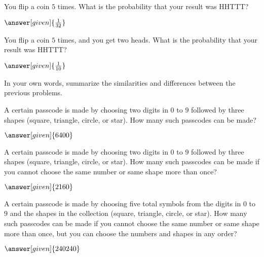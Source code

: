 \documentclass[nooutcomes]{ximera}
\begin{document}
\begin{problem}
	You flip a coin $5$ times.  What is the probability that your result was HHTTT?
	\begin{prompt}
		$\answer[given]{\frac{1}{32}}$
	\end{prompt}
\end{problem}


\begin{problem}
	You flip a coin $5$ times, and you get two heads.  What is the probability that your result was HHTTT?
	\begin{prompt}
		$\answer[given]{\frac{1}{10}}$
	\end{prompt}
\end{problem}

\begin{problem}
In your own words, summarize the similarities and differences between the previous problems.

\begin{freeResponse}
\end{freeResponse}
\end{problem}


\begin{problem}
A certain passcode is made by choosing two digits in $0$ to $9$ followed by three shapes (square, triangle, circle, or star).  How many such passcodes can be made?
\begin{prompt}
	$\answer[given]{6400}$
\end{prompt}
\end{problem}



\begin{problem}
A certain passcode is made by choosing two digits in $0$ to $9$ followed by three shapes (square, triangle, circle, or star).  How many such passcodes can be made if you cannot choose the same number or same shape more than once?
\begin{prompt}
	$\answer[given]{2160}$
\end{prompt}
\end{problem}



\begin{problem}
A certain passcode is made by choosing five total symbols from the digits in $0$ to $9$ and the shapes in the collection (square, triangle, circle, or star).  How many such passcodes can be made if you cannot choose the same number or same shape more than once, but you can choose the numbers and shapes in any order?
\begin{prompt}
	$\answer[given]{240240}$
\end{prompt}
\end{problem}
\end{document}
